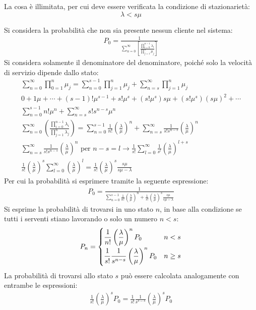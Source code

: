\documentclass{article}
\numberwithin{equation}{subsection}
\begin{document}
La cosa è illimitata, per cui deve essere verificata la condizione di stazionarietà: 
\begin{equation*}
    \lambda<s\mu
\end{equation*}

Si considera la probabilità che non sia presente nessun cliente nel sistema:
\begin{gather*}
    P_0=\displaystyle\frac{1}{\displaystyle\sum_{n=0}^{\infty}\left[\frac{\displaystyle\prod_{i=0}^{n-1}\lambda_i}{\displaystyle\prod_{j=1}^n\mu_j}\right]}
\end{gather*}
Si considera solamente il denominatore del denominatore, poiché solo la velocità di servizio dipende dallo stato:
\begin{gather*}
    \displaystyle\sum_{n=0}^{\infty}\prod_{0=1}^n\mu_j=\sum_{n=0}^{s-1}\prod_{j=1}^n\mu_j+\sum_{n=s}^{\infty}\prod_{j=1}^n\mu_j\\
    0+1\mu+\cdots+(s-1)!\mu^{s-1}+s!\mu^s+(s!\mu^s)s\mu+(s!\mu^s)(s\mu)^2+\cdots\\
    \displaystyle\sum_{n=0}^{s-1}n!\mu^n+\sum_{n=s}^{\infty}s!s^{n-s}\mu^n\\
    \displaystyle\sum_{n=0}^{\infty}\left(\frac{\displaystyle\prod_{i=0}^{n-1}\lambda_i}{\displaystyle\prod_{j=1}^n\lambda_j}\right)=\sum_{n=0}^{s-1}\frac{1}{n!}\left(\frac{\lambda}{\mu}\right)^n+\sum_{n=s}^{\infty}\frac{1}{s!s^{n-s}}\left(\frac{\lambda}{\mu}\right)^n\\
    \displaystyle\sum_{n=s}^{\infty}\frac{1}{s!s^{n-s}}\left(\frac{\lambda}{\mu}\right)^n\mbox{ per }n-s=l\to\frac{1}{s!}\sum_{l=0}^{\infty}\frac{1}{s^l}\left(\frac{\lambda}{\mu}\right)^{l+s}\\
    \frac{1}{s!}\left(\frac{\lambda}{\mu}\right)^s\sum_{l=0}^{\infty}\left(\frac{\lambda}{\mu}\right)^l=\frac{1}{s!}\left(\frac{\lambda}{\mu}\right)^s\frac{s\mu}{s\mu-\lambda}
\end{gather*}
Per cui la probabilità si esprimere tramite la seguente espressione:
\begin{gather}
    P_0=\displaystyle\frac{1}{\displaystyle\sum_{n=0}^{s-1}\frac{1}{n!}\left(\frac{\lambda}{\mu}\right)^n+\frac{1}{s!}\left(\frac{\lambda}{\mu}\right)^s\frac{s\mu}{s\mu-\lambda}}
\end{gather}
Si esprime la probabilità di trovarsi in uno stato $n$, in base alla condizione se tutti i serventi stiano lavorando o solo un numero $n<s$:
\begin{gather*}
   P_n=\begin{cases}
    \displaystyle\frac{\strut 1}{\strut n!}\left(\frac{\lambda}{\mu}\right)^nP_0&n<s\\
    \displaystyle\frac{\strut1}{\strut s!}\frac{\strut 1}{\strut s^{n-s}}\left(\frac{\lambda}{\mu}\right)^nP_0&n\geq s
   \end{cases} 
\end{gather*}
La probabilità di trovarsi allo stato $s$ può essere calcolata analogamente con entrambe le espressioni:
\begin{gather*}
    \displaystyle\frac{1}{s!}\left(\frac{\lambda}{\mu}\right)^sP_0=\frac{1}{s!}\frac{1}{s^{s-s}}\left(\frac{\lambda}{\mu}\right)^sP_0
\end{gather*}
\end{document}

